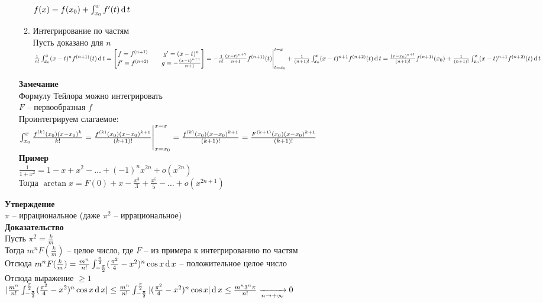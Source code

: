 \documentclass[12pt]{article}
\begin{document}
\begin{enumerate}
\begin{enumerate}
        $f(x) = f(x_0) + \int_{x_0}^x f'(t)\operatorname{d} t$
        \item Интегрирование по частям\\
        Пусть доказано для $n$\\
        $\frac1{n!}\int_{x_0}^x (x-t)^n f^{(n+1)}(t)\operatorname{d} t = \begin{bmatrix}
        f = f^{(n+1)} && g' = (x-t)^n\\
        f' = f^{(n+2)} && g = -\frac{(x-t)^{n+1}}{n+1}
        \end{bmatrix} = -\frac1{n!}\frac{(x-t)^{n+1}}{n+1}f^{(n+1)}(t) \Biggr|_{t=x_0}^{t=x} + \frac1{(n+1)!}\int_{x_0}^x (x-t)^{n+1}f^{(n+2)}(t)\operatorname{d} t = \frac{(x-x_0)^{n+1}}{(n+1)!}f^{(n+1)}(x_0) + \frac1{(n+1)!}\int_{x_0}^x (x-t)^{n+1}f^{(n+2)}(t)\operatorname{d} t$
    \end{enumerate}
    \textbf{Замечание}\\
    Формулу Тейлора можно интегрировать\\
    $F$ -- первообразная $f$\\
    Проинтегрируем слагаемое:\\
    $\int_{x_0}^x \frac{f^{(k)}(x_0)(x-x_0)^k}{k!} = \frac{f^{(k)}(x_0)(x-x_0)^{k+1}}{(k+1)!}\Biggr|_{x=x_0}^{x=x} = \frac{f^{(k)}(x_0)(x-x_0)^{k+1}}{(k+1)!} = \frac{F^{(k+1)}(x_0)(x-x_0)^{k+1}}{(k+1)!}$\\
    \textbf{Пример}\\
    $\frac1{1+x^2}=1-x+x^2-\ldots + (-1)^nx^{2n} + o(x^{2n})$\\
    Тогда $\arctan x = F(0) + x - \frac{x^3}{3} + \frac{x^5}{5} - \ldots + o(x^{2n+1})$\\
\end{enumerate}
\textbf{Утверждение}\\
$\pi$ -- иррациональное (даже $\pi^2$ -- иррациональное)\\
\textbf{Доказательство}\\
Пусть $\pi^2 = \frac km$\\
Тогда $m^n F(\frac km)$ -- целое число, где $F$ -- из примера к интегрированию по частям\\
Отсюда $m^n F(\frac km) =  \frac{m^n}{n!}\int_{-\frac\pi2}^{\frac\pi2}(\frac{\pi^2}4 - x^2)^n\cos x \operatorname{d} x$ -- положительное целое число\\
Отсюда выражение $\geq 1$\\
$|\frac{m^n}{n!}\int_{-\frac\pi2}^{\frac\pi2}(\frac{\pi^2}4 - x^2)^n\cos x \operatorname{d} x| \leq \frac{m^n}{n!}\int_{-\frac\pi2}^{\frac\pi2}|(\frac{\pi^2}4 - x^2)^n\cos x| \operatorname{d} x \leq \frac{m^n 3^n \pi}{n!} \xrightarrow[n \rightarrow +\infty]{} 0$\\
\end{document}

